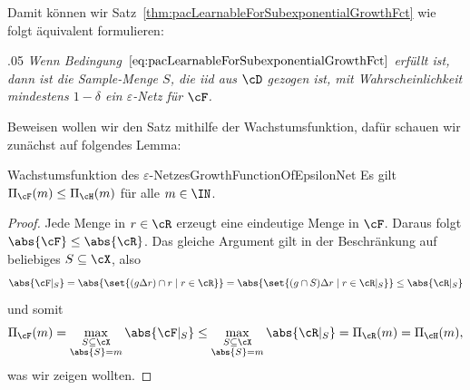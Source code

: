 \documentclass[language=ngerman,algolist,acrolist]{TemplateLecture}
\begin{document}
Damit können wir Satz~\ref{thm:pacLearnableForSubexponentialGrowthFct} wie folgt äquivalent formulieren:
\begin{addmargin}{.05\textwidth}
    \emph{Wenn Bedingung~$\eqref{eq:pacLearnableForSubexponentialGrowthFct}$ erfüllt ist, dann ist die Sample-Menge $S$, die \ac{iid} aus $\cD$ gezogen ist, mit Wahrscheinlichkeit mindestens $1 - \delta$ ein $\varepsilon$-Netz für $\cF$.}
\end{addmargin}

Beweisen wollen wir den Satz mithilfe der Wachstumsfunktion, dafür schauen wir zunächst auf folgendes Lemma:

\begin{lem}{Wachstumsfunktion des $\varepsilon$-Netzes}{GrowthFunctionOfEpsilonNet}
    Es gilt $\Pi_\cF(m) \leq \Pi_\cH(m)$ für alle $m \in \IN$.
\end{lem}
\begin{proof}
    Jede Menge in $r \in \cR$ erzeugt eine eindeutige Menge in $\cF$. Daraus folgt $\abs{\cF} \leq \abs{\cR}$. Das gleiche Argument gilt in der Beschränkung auf beliebiges $S \subseteq \cX$, also
    \begin{equation*}
        \abs{\cF|_S} = \abs{\set{(g \Delta r) \cap r \mid r \in \cR}} = \abs{\set{(g \cap S) \Delta r \mid r \in \cR|_S}} \leq \abs{\cR|_S}
    \end{equation*}
    und somit 
    \begin{equation*}
        \Pi_\cF(m) = \max_{\substack{S \subseteq \cX \\ \abs{S} = m}} \abs{\cF|_S} \leq \max_{\substack{S \subseteq \cX \\ \abs{S} = m}} \abs{\cR|_S} = \Pi_\cR(m) = \Pi_\cH(m),
    \end{equation*}
    was wir zeigen wollten.
\end{proof}
\end{document}
